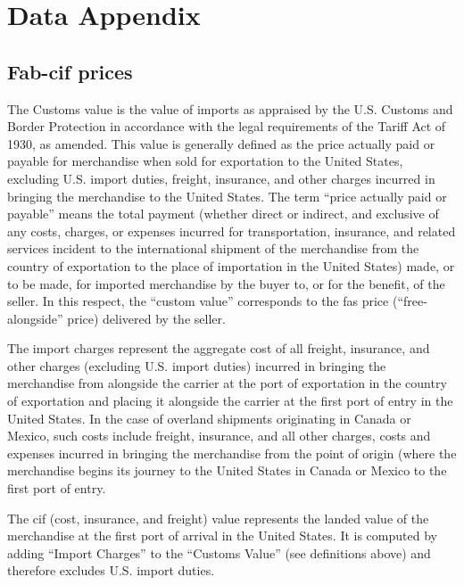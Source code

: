 \documentclass[a4paper,11pt]{article}
\begin{document}
\newpage


\appendix

\section{Data Appendix \label{app:data}}

\subsection{Fab-cif prices}

The Customs value is the value of imports as appraised by the U.S. Customs and Border Protection in accordance with the legal requirements of the Tariff Act of 1930, as amended. This value is generally defined as the price actually paid or payable for merchandise when sold for exportation to the United States, excluding U.S. import duties, freight, insurance, and other charges incurred in bringing the merchandise to the United States. The term ``price actually paid or payable'' means the total payment (whether direct or indirect, and exclusive of any costs, charges, or expenses incurred for transportation, insurance, and related services incident to the international shipment of the merchandise from the country of exportation to the place of importation in the United States) made, or to be made, for imported merchandise by the buyer to, or for the benefit, of the seller. In this respect, the ``custom value'' corresponds to the fas price (``free-alongside'' price) delivered by the seller.

The import charges represent the aggregate cost of all freight, insurance, and other charges (excluding U.S. import duties) incurred in bringing the merchandise from alongside the carrier at the port of exportation in the country of exportation and placing it alongside the carrier at the first port of entry in the United States. In the case of overland shipments originating in Canada or Mexico, such costs include freight, insurance, and all other charges, costs and expenses incurred in bringing the merchandise from the point of origin (where the merchandise begins its journey to the United States in Canada or Mexico to the first port of entry.

The cif (cost, insurance, and freight) value represents the landed value of the merchandise at the first port of arrival in the United States. It is computed by adding ``Import Charges'' to the ``Customs Value'' (see definitions above) and therefore excludes U.S. import duties.
\end{document}
